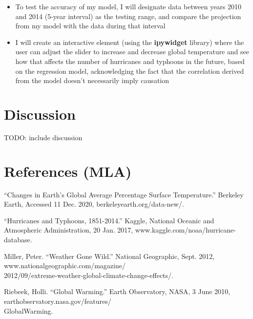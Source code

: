 \documentclass[fontsize=11pt]{article}
\begin{document}
\begin{itemize}
    \item To test the accuracy of my model, I will designate data between years 2010 and 2014 (5-year interval) as the testing range, and compare the projection from my model with the data during that interval

    \item I will create an interactive element (using the \textbf{ipywidget} library) where the user can adjust the slider to increase and decrease global temperature and see how that affects the number of hurricanes and typhoons in the future, based on the regression model, acknowledging the fact that the correlation derived from the model doesn't necessarily imply causation
\end{itemize}

\section*{Discussion}

TODO: include discussion

\section*{References (MLA)}

\begin{hangparas}{0.5in}{1}

“Changes in Earth's Global Average Percentage Surface Temperature.” Berkeley Earth, Accessed 11 Dec. 2020, berkeleyearth.org/data-new/.

\bigskip

“Hurricanes and Typhoons, 1851-2014.” Kaggle, National Oceanic and Atmospheric Administration, 20 Jan. 2017, www.kaggle.com/noaa/hurricane-database.

\bigskip

Miller, Peter. “Weather Gone Wild.” National Geographic, Sept. 2012, www.nationalgeographic.com/magazine/\\2012/09/extreme-weather-global-climate-change-effects/.

\bigskip

Riebeek, Holli. “Global Warming.” Earth Observatory, NASA, 3 June 2010, earthobservatory.nasa.gov/features/\\GlobalWarming.

\end{hangparas}
\end{document}
